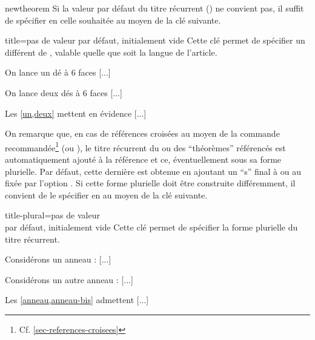 \documentclass[french,nolocaltoc]{nwejmart}
\newtheorem[style=definition]{fait}
\newtheorem[title=expérience]{experience}
\newtheorem[title-plural=anneaux]{anneau}
\newtheorem[title=idéal,title-plural=idéaux]{ideal}
\begin{document}
\begin{docCommand}{newtheorem}{}
  Si la valeur par défaut du titre récurrent () ne convient pas, il
  suffit de spécifier en  celle souhaitée au moyen de la clé
   suivante.
  \begin{docKey}{title}{={}}{pas de
      valeur par défaut, initialement vide}
    Cette clé permet de spécifier un  différent de
    , valable quelle que soit la langue de l'article.
  \end{docKey}
\begin{bodycode}[listing and text,listing options={deletekeywords={[2]label}}]
\begin{experience}\label{un}
On lance un dé à 6 faces [...]
\end{experience}
\begin{experience}\label{deux}
On lance deux dés à 6 faces [...]
\end{experience}
Les \vref{un,deux} mettent en évidence [...]
\end{bodycode}

  On remarque que, en cas de références croisées au moyen de la commande
  recommandée\footnote{Cf. \vref{sec-references-croisees}}  (ou
  ), le titre récurrent du ou des \enquote{théorèmes} référencés
  est automatiquement ajouté à la référence et ce, éventuellement sous sa forme
  plurielle. Par défaut, cette dernière est obtenue en ajoutant un \enquote{s}
  final à  ou au  fixée par l'option
  . Si cette forme plurielle doit être construite différemment, il
  convient de le spécifier en  au moyen de la clé
   suivante.
  \begin{docKey}{title-plural}{={}}{pas de
      valeur\\par défaut, initialement vide}
    Cette clé permet de spécifier la forme plurielle du titre récurrent.
  \end{docKey}
\begin{bodycode}[listing and text,listing options={deletekeywords={[2]label}}]
\begin{anneau}\label{anneau}
Considérons un anneau : [...]
\end{anneau}
\begin{anneau}\label{anneau-bis}
Considérons un autre anneau : [...]
\end{anneau}
Les \vref{anneau,anneau-bis} admettent [...]
\end{bodycode}


\end{docCommand}
\end{document}
